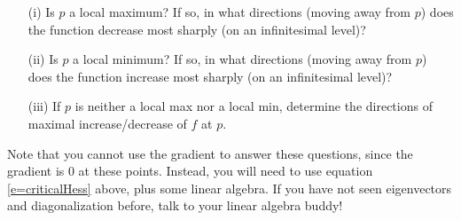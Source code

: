 \documentclass[a4paper, 12pt]{article}
\begin{document}
\begin{problem} 
\begin{enumerate}
        \begin{itemize}
            \item[(i)] Is $p$ a local maximum?  If so, in what directions (moving away from $p$) does the function decrease most sharply (on an infinitesimal level)?
            \item[(ii)] Is $p$ a local minimum?  If so, in what directions (moving away from $p$) does the function increase most sharply (on an infinitesimal level)?
            \item[(iii)] If $p$ is neither a local max nor a local min, determine the directions of maximal increase/decrease of $f$ at $p$.
        \end{itemize}

        Note that  you cannot use the gradient to answer these questions,  since the gradient is $0$ at these points. Instead, you will need to use equation \eqref{e=criticalHess} above, plus some linear algebra. If you have not seen eigenvectors and diagonalization before, talk to your linear algebra buddy!
\end{enumerate}
\end{problem}
\end{document}
